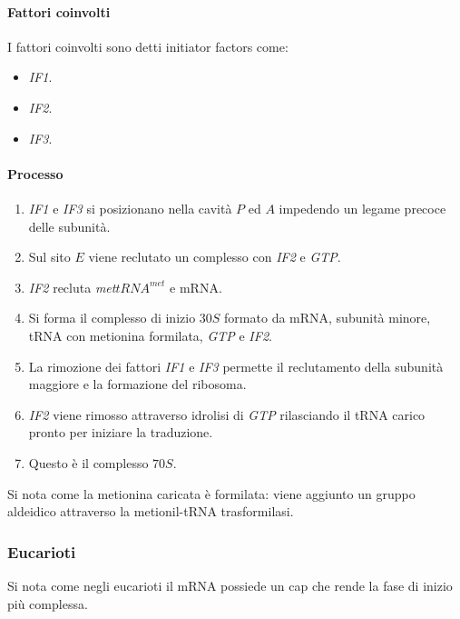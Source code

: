 			\paragraph{Fattori coinvolti}
			I fattori coinvolti sono detti initiator factors come:
			\begin{multicols}{3}
				\begin{itemize}
					\item \emph{IF1}.
					\item \emph{IF2}.
					\item \emph{IF3}.
				\end{itemize}
			\end{multicols}

			\paragraph{Processo}
			\begin{multicols}{2}
				\begin{enumerate}
					\item \emph{IF1} e \emph{IF3} si posizionano nella cavit\`a $P$ ed $A$ impedendo un legame precoce delle subunit\`a.
					\item Sul sito $E$ viene reclutato un complesso con \emph{IF2} e \emph{GTP}.
					\item \emph{IF2} recluta \emph{met$tRNA^{met}$} e mRNA.
					\item Si forma il complesso di inizio $30S$ formato da mRNA, subunit\`a minore, tRNA con metionina formilata, \emph{GTP} e \emph{IF2}.
					\item La rimozione dei fattori \emph{IF1} e \emph{IF3} permette il reclutamento della subunit\`a maggiore e la formazione del ribosoma.
					\item \emph{IF2} viene rimosso attraverso idrolisi di \emph{GTP} rilasciando il tRNA carico pronto per iniziare la traduzione.
					\item Questo \`e il complesso $70S$.
				\end{enumerate}
			\end{multicols}
			Si nota come la metionina caricata \`e formilata: viene aggiunto un gruppo aldeidico attraverso la metionil-tRNA trasformilasi.

		\subsubsection{Eucarioti}
		Si nota come negli eucarioti il mRNA possiede un cap che rende la fase di inizio pi\`u complessa.


